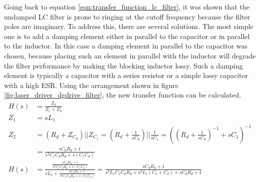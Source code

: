 Going back to equation \ref{eqn:transfer_function_lc_filter}, it was shown that the undamped LC filter is prone to ringing at the cutoff frequency because the filter poles are imaginary. To address this, there are several solutions. The most simple one is to add a damping element either in parallel to the capacitor or in parallel to the inductor. In this case a damping element in parallel to the capacitor was chosen, because placing such an element in parallel with the inductor will degrade the filter performance by making the blocking inductor lossy. Such a damping element is typically a capacitor with a series resistor or a simple lossy capacitor with a high ESR. Using the arrangement shown in figure \ref{fig:laser_driver_dgdrive_filter}, the new transfer function can be calculated.
\begin{align}
    H(s) &= \frac{Z_2}{Z_1 + Z_2} \nonumber\\
    Z_1 &= sL_1 \nonumber\\
    Z_2 &= \left(R_d + Z_{C_d}\right) || Z_{C_1} = \left(R_d + \frac{1}{s C_d}\right) || \frac{1}{s C_1} = \left(\left(R_d + \frac{1}{sC_d}\right)^{-1} + sC_1\right)^{-1} \nonumber\\
    &= \frac{s C_d R_d +1}{s^2 C_1 C_d R_d + s \left(C_1 C_d\right)}\\
    H(s) &= \frac{\frac{s C_d R_d +1}{s^2 C_1 C_d R_d + s \left(C_1 C_d\right)}}{s L_1  + \frac{s C_d R_d +1}{s^2 C_1 C_d R_d + s \left(C_1 C_d\right)}} = \frac{s C_d R_d +1}{s^3 L_1 C_1 C_d R_d + s^2 L_1 \left(C_1 + C_d\right) + s C_d R_d +1 }
\end{align}

